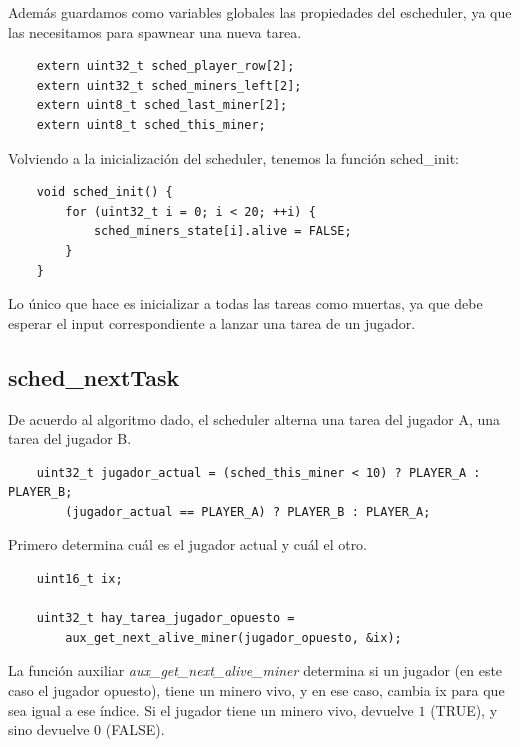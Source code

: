 \documentclass[a4paper]{article}
\newenvironment{codesnippet}{%
	\begin{Sbox}\begin{minipage}{\textwidth}\sffamily\small}%
	{\end{minipage}\end{Sbox}%
		\begin{center}%
		\vspace{-0.4cm}\colorbox{litegrey}{\TheSbox}\end{center}\vspace{0.3cm}}
\begin{document}
Además guardamos como variables globales las propiedades del escheduler, ya que las necesitamos para spawnear una nueva
tarea.
\begin{codesnippet}
  \begin{verbatim}
	extern uint32_t sched_player_row[2];
	extern uint32_t sched_miners_left[2];
	extern uint8_t sched_last_miner[2];
	extern uint8_t sched_this_miner;
  \end{verbatim}
\end{codesnippet}

Volviendo a la inicialización del scheduler, tenemos la función sched_init:

\begin{codesnippet}
  \begin{verbatim}
	void sched_init() {
	    for (uint32_t i = 0; i < 20; ++i) {
	        sched_miners_state[i].alive = FALSE;
	    }
	}
  \end{verbatim}
\end{codesnippet}

Lo único que hace es inicializar a todas las tareas como muertas, ya que debe esperar el input correspondiente a lanzar
una tarea de un jugador.

\subsection{sched_nextTask}
De acuerdo al algoritmo dado, el scheduler alterna una tarea del jugador A, una tarea del jugador B.

\begin{codesnippet}
  \begin{verbatim}
    uint32_t jugador_actual = (sched_this_miner < 10) ? PLAYER_A : PLAYER_B;
        (jugador_actual == PLAYER_A) ? PLAYER_B : PLAYER_A;
  \end{verbatim}
\end{codesnippet}

Primero determina cuál es el jugador actual y cuál el otro.

\begin{codesnippet}
  \begin{verbatim}
    uint16_t ix;

    uint32_t hay_tarea_jugador_opuesto =
        aux_get_next_alive_miner(jugador_opuesto, &ix);
  \end{verbatim}
\end{codesnippet}

La función auxiliar \textit{aux_get_next_alive_miner} determina si un jugador (en este caso el jugador opuesto), tiene
un minero vivo, y en ese caso, cambia ix para que sea igual a ese índice. Si el jugador tiene un minero vivo, devuelve
$1$ (TRUE), y sino devuelve $0$ (FALSE).
\end{document}
